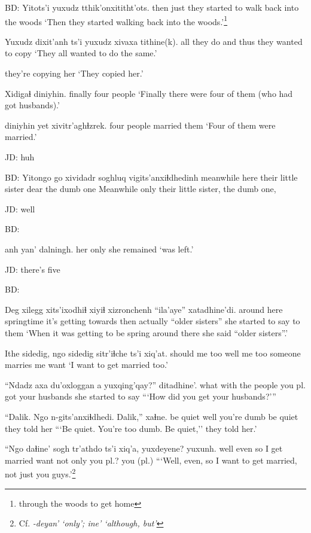 \documentclass[12pt]{article}
\begin{document}
BD:  
\gll Yitots'i yuxudz tthik'onxititht'ots.
then     just    {they started to walk back into the woods}
\glt `Then they started walking back into the woods.'\footnote{through the woods to get home}
\glend

\gll Yuxudz dixit'anh ts'i yuxudz {xivaxa tithine(k)}.
all {they do} and thus {they wanted to copy}
\glt `They all wanted to do the same.'
\glend

{{they're copying her}}
\glt `They copied her.'
\glend

\gll Xidigaɬ diniyhin. 
finally {four people}
\glt `Finally there were four of them (who had got husbands).'
\glend

 diniyhin yet xivitr'aghɬzrek. 
{} {four people} {} {married them}
\glt `Four of them were married.'
\glend

JD:  huh

BD:  
\gll Yitongo go xividadr soghluq vigits'anxiɬdhedinh 
meanwhile here {their little sister} dear {the dumb one} 
\glt Meanwhile only their little sister, the dumb one, 
\glend

JD:  well

BD:  

\gll anh yan' dalningh.
her only {she remained}
\glt `was left.'
\glend

JD:  there's five

BD:  

\gll Deg xilegg xits'ixodhiɬ xiyiɬ xizronchenh ``ila'aye'' xatadhine'di.
{around here} {springtime} {it's getting towards} then actually {``older sisters'' } {she started to say to them}
\glt `When it was getting to be spring around there she said ``older sisters''.'
\glend

\gll Ithe sidedig, ngo sidedig sitr'iɬche ts'i xiq'at.
should {me too} well {me too} {someone marries me} {} want
\glt `I want to get married too.'
\glend

\gll ``Ndadz axa du'oxloggan a yuxqing'qay?'' ditadhine'.
what  with {the people you pl. got} {} {your husbands} {she started to say}
\glt ```How did you get your husbands?'''
\glend

\gll ``Dalik. Ngo n-gits'anxiɬdhedi. Dalik,'' xaɬne.
{be quiet} well {you're dumb} {be quiet} {they told her}
\glt ```Be quiet. You're too dumb. Be quiet,'' they told her.'
\glend

\gll ``Ngo daɬine' {sogh tr'athdo} ts'i xiq'a, yuxdeyene? yuxunh.
well {even so} {I get married} {} want {not only you pl.?} {you (pl.)}
\glt ```Well, even, so I want to get married, not just you guys.'\footnote{Cf. \em -deyan' \em `only'; \em ine' \em `although, but'}
\glend
\end{document}
